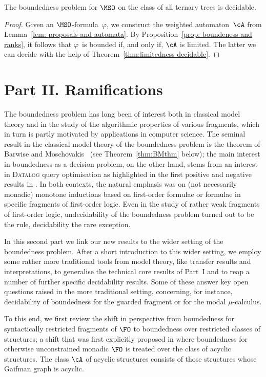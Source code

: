 \documentclass{LMCS}
\begin{document}
\begin{thm}\label{thm:boundedness for ternary trees}
The boundedness problem for $\MSO$ on the class
of all ternary trees is decidable.
\end{thm}
\begin{proof}
Given an $\MSO$-formula~$\varphi$, we construct
the weighted automaton~$\cA$ from Lemma~\ref{lem: proposals and automata}.
By Proposition~\ref{prop: boundeness and ranks}, it follows
that $\varphi$~is bounded if, and only if, $\cA$ is limited.
The latter we can decide with the help of
Theorem~\ref{thm:limitedness decidable}.
\end{proof}


\bigskip
\section*{Part II. Ramifications}


The boundedness problem has long been of interest
both in classical model theory and in the study of
the algorithmic properties of various fragments,
which in turn is partly motivated by applications
in computer science. The seminal result in the classical
model theory of the boundedness problem 
is the theorem of Barwise and Moschovakis~\cite{BarwiseMoschovakis78}
(see Theorem~\ref{thm:BMthm} below)\?;
the main interest in boundedness as a decision problem,
on the other hand, stems from an interest in \textsc{Datalog}
query optimisation as highlighted in the
first positive and negative results in
\cite{GaifmanMaSaVa93,HillebrandEtAl95}.
In both contexts, the natural emphasis
was on (not necessarily monadic) monotone inductions based on
first-order formulae or formulae in specific fragments of first-order
logic. Even in the study of rather weak fragments of first-order logic,
undecidability of the boundedness problem turned out to be the rule,
decidability the rare exception.


In this second part we link our new results to the wider setting
of the boundedness problem. After a short introduction to
this wider setting, we employ some rather more traditional tools
from model theory, like transfer results and interpretations,
to generalise the technical core results of Part~I and to
reap a number of further specific decidability results.
Some of these answer key open questions raised in the
more traditional setting, concerning, for instance, decidability
of boundedness for the guarded fragment or for the modal $\mu$-calculus.


To this end, we first review the shift in perspective
from boundedness for syntactically restricted fragments of $\FO$
to boundedness over restricted classes of structures\?;
a shift that was first explicitly proposed in \cite{KOS}
where boundedness for otherwise unconstrained monadic $\FO$
is treated over the class of acyclic structures.
The class $\cA$ of acyclic structures consists of those
structures whose Gaifman graph is acyclic.
\end{document}
